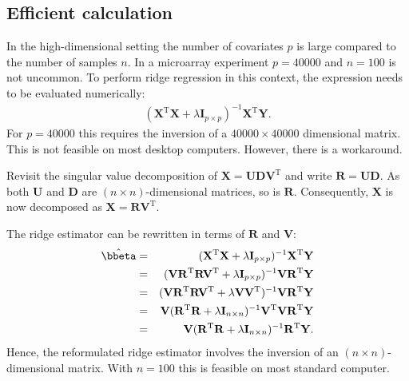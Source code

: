 \documentclass[a4paper]{article}
\theoremstyle{myexamplestyle}
\begin{document}
\subsection{Efficient calculation}
In the high-dimensional setting the number of covariates $p$ is large compared to the number of samples $n$. In a microarray experiment $p = 40000$ and $n= 100$ is not uncommon. To perform ridge regression in this context, the expression needs to be evaluated numerically:
\begin{eqnarray*}
(\mathbf{X}^{\mathrm{T}} \mathbf{X} + \lambda \mathbf{I}_{p \times p})^{-1} \mathbf{X}^{\mathrm{T}} \mathbf{Y}.
\end{eqnarray*}
For $p=40000$ this requires the inversion of a $40000 \times 40000$ dimensional matrix. This is not feasible on most desktop computers. However, there is a workaround.

Revisit the singular value decomposition of $\mathbf{X} = \mathbf{U} \mathbf{D} \mathbf{V}^{\mathrm{T}}$ and write $\mathbf{R} = \mathbf{U} \mathbf{D}$. As both $\mathbf{U}$ and $\mathbf{D}$ are $(n \times n)$-dimensional matrices, so is $\mathbf{R}$. Consequently, $\mathbf{X}$ is now decomposed as $\mathbf{X} = \mathbf{R}  \mathbf{V}^{\mathrm{T}}$. 

The ridge estimator can be rewritten in terms of $\mathbf{R}$ and $\mathbf{V}$:
\begin{eqnarray*}
\hat{\bbeta} & = & (\mathbf{X}^{\mathrm{T}} \mathbf{X} + \lambda \mathbf{I}_{p \times p})^{-1} \mathbf{X}^{\mathrm{T}} \mathbf{Y}
\\
& = & (\mathbf{V} \mathbf{R}^{\mathrm{T}} \mathbf{R} \mathbf{V}^{\mathrm{T}}  + \lambda \mathbf{I}_{p \times p})^{-1} \mathbf{V}\mathbf{R}^{\mathrm{T}} \mathbf{Y}
\\
& = & (\mathbf{V} \mathbf{R}^{\mathrm{T}} \mathbf{R}  \mathbf{V}^{\mathrm{T}} + \lambda \mathbf{V}  \mathbf{V}^{\mathrm{T}})^{-1} \mathbf{V} \mathbf{R}^{\mathrm{T}} \mathbf{Y}
\\
& = & \mathbf{V} (\mathbf{R}^{\mathrm{T}} \mathbf{R}  + \lambda \mathbf{I}_{n \times n})^{-1} \mathbf{V}^{\mathrm{T}}  \mathbf{V} \mathbf{R}^{\mathrm{T}} \mathbf{Y}
\\
& = & \mathbf{V} (\mathbf{R}^{\mathrm{T}} \mathbf{R}  + \lambda \mathbf{I}_{n \times n})^{-1} \mathbf{R}^{\mathrm{T}} \mathbf{Y}.
\end{eqnarray*}
Hence, the reformulated ridge estimator involves the inversion of an $(n \times n)$-dimensional matrix. With $n= 100$ this is feasible on most standard computer.
\end{document}
